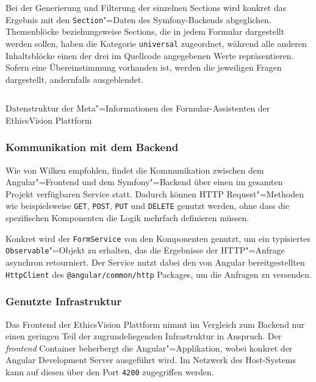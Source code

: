 \documentclass[a4paper,12pt,twoside]{scrreprt}
\begin{document}
Bei der Generierung und Filterung der einzelnen Sections wird konkret das Ergebnis mit den \texttt{Section}"=Daten des Symfony-Backends abgeglichen. Themenblöcke beziehungsweise Sections, die in jedem Formular dargestellt werden sollen, haben die Kategorie \texttt{universal} zugeordnet, während alle anderen Inhaltsblöcke einen der drei im Quellcode angegebenen Werte repräsentieren. Sofern eine Übereinstimmung vorhanden ist, werden die jeweiligen Fragen dargestellt, andernfalls ausgeblendet.

\begin{listing}[ht]
    \inputminted[fontsize=\footnotesize,linenos,xleftmargin=8mm]{typescript}{code/Luidold_Application-Assistant-Result.ts}
    \caption{Datenstruktur der Meta"=Informationen des Formular-Assistenten der EthicsVision Plattform}
    \label{code:application-assistant-result}
\end{listing}

\subsubsection*{Kommunikation mit dem Backend}
\label{sub-sub-sec:angular-kommunikation-backend}

Wie von Wilken empfohlen, findet die Kommunikation zwischen dem Angular"=Frontend und dem Symfony"=Backend über einen im gesamten Projekt verfügbaren Service statt. Dadurch können HTTP Request"=Methoden wie beispielsweise \texttt{GET}, \texttt{POST}, \texttt{PUT} und \texttt{DELETE} genutzt werden, ohne dass die spezifischen Komponenten die Logik mehrfach definieren müssen. \cite[142\psqq]{wilken_angular_2018}

Konkret wird der \texttt{FormService} von den Komponenten genutzt, um ein typisiertes \texttt{Observable}"=Objekt zu erhalten, das die Ergebnisse der HTTP"=Anfrage asynchron retourniert. Der Service nutzt dabei den von Angular bereitgestellten \texttt{HttpClient} des \texttt{@angular/common/http} Packages, um die Anfragen zu versenden. \cite{google_llc_2023-angular-http-comm}

\subsubsection*{Genutzte Infrastruktur}
\label{sub-sub-sec:frontend-genutzte-infrastruktur}

Das Frontend der EthicsVision Plattform nimmt im Vergleich zum Backend nur einen geringen Teil der zugrundeliegenden Infrastruktur in Anspruch. Der \textit{frontend} Container beherbergt die Angular"=Applikation, wobei konkret der Angular Development Server ausgeführt wird. Im Netzwerk des Host-Systems kann auf diesen über den Port \texttt{4200} zugegriffen werden.
\end{document}

